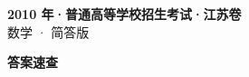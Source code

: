 \documentclass[zihao=-4, a4paper]{ctexart}
\begin{document}
\begin{center}
  {\Large\bfseries 2010 年·普通高等学校招生考试·江苏卷}\\[4pt]
  {\large 数学 · 简答版}
\end{center}
\medskip
{}

\clearpage
{}
\begin{center}{\Large\bfseries 答案速查}\end{center}
\medskip

\end{document}
